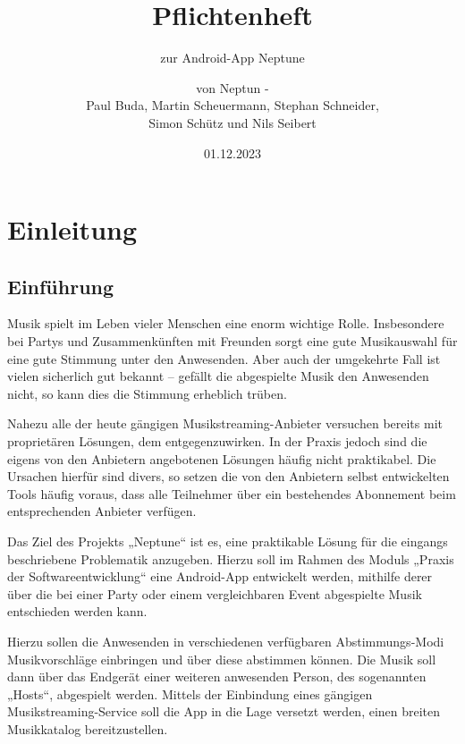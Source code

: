 \documentclass[oneside, ngerman]{sdqtechreport}
\author{von Neptun - \\
Paul Buda, Martin Scheuermann, Stephan Schneider, \\
Simon Schütz und Nils Seibert}
\title{Pflichtenheft}
\subtitle{zur Android-App Neptune}
\date{01.12.2023}
\begin{document}
\setpdf

\maketitle

\tableofcontents

\cleardoublepage


\chapter{Einleitung}
\label{chap:Einleitung}

\section{Einführung}
\label{sec:Einleitung:Einführung}
Musik spielt im Leben vieler Menschen eine enorm wichtige Rolle. Insbesondere bei Partys und Zusammenkünften mit Freunden sorgt eine gute Musikauswahl für eine gute Stimmung unter den Anwesenden. Aber auch der umgekehrte Fall ist vielen sicherlich gut bekannt – gefällt die abgespielte Musik den Anwesenden nicht, so kann dies die Stimmung erheblich trüben.

Nahezu alle der heute gängigen Musikstreaming-Anbieter versuchen bereits mit proprietären Lösungen, dem entgegenzuwirken. In der Praxis jedoch sind die eigens von den Anbietern angebotenen Lösungen häufig nicht praktikabel. Die Ursachen hierfür sind divers, so setzen die von den Anbietern selbst entwickelten Tools häufig voraus, dass alle Teilnehmer über ein bestehendes Abonnement beim entsprechenden Anbieter verfügen. 

Das Ziel des Projekts „Neptune“ ist es, eine praktikable Lösung für die eingangs beschriebene Problematik anzugeben. Hierzu soll im Rahmen des Moduls „Praxis der Softwareentwicklung“ eine Android-App entwickelt werden, mithilfe derer über die bei einer Party oder einem vergleichbaren Event abgespielte Musik entschieden werden kann.

Hierzu sollen die Anwesenden in verschiedenen verfügbaren Abstimmungs-Modi Musikvorschläge einbringen und über diese abstimmen können. Die Musik soll dann über das Endgerät einer weiteren anwesenden Person, des sogenannten „Hosts“, abgespielt werden. 
Mittels der Einbindung eines gängigen Musikstreaming-Service soll die App in die Lage versetzt werden, einen breiten Musikkatalog bereitzustellen.
\end{document}

